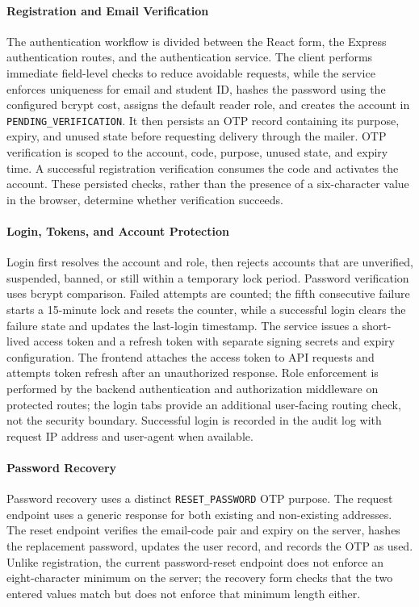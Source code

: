 \paragraph{Registration and Email Verification}
The authentication workflow is divided between the React form, the Express authentication routes, and the authentication service. The client performs immediate field-level checks to reduce avoidable requests, while the service enforces uniqueness for email and student ID, hashes the password using the configured bcrypt cost, assigns the default reader role, and creates the account in \texttt{PENDING\_VERIFICATION}. It then persists an OTP record containing its purpose, expiry, and unused state before requesting delivery through the mailer. OTP verification is scoped to the account, code, purpose, unused state, and expiry time. A successful registration verification consumes the code and activates the account. These persisted checks, rather than the presence of a six-character value in the browser, determine whether verification succeeds.

\paragraph{Login, Tokens, and Account Protection}
Login first resolves the account and role, then rejects accounts that are unverified, suspended, banned, or still within a temporary lock period. Password verification uses bcrypt comparison. Failed attempts are counted; the fifth consecutive failure starts a 15-minute lock and resets the counter, while a successful login clears the failure state and updates the last-login timestamp. The service issues a short-lived access token and a refresh token with separate signing secrets and expiry configuration. The frontend attaches the access token to API requests and attempts token refresh after an unauthorized response. Role enforcement is performed by the backend authentication and authorization middleware on protected routes; the login tabs provide an additional user-facing routing check, not the security boundary. Successful login is recorded in the audit log with request IP address and user-agent when available.

\paragraph{Password Recovery}
Password recovery uses a distinct \texttt{RESET\_PASSWORD} OTP purpose. The request endpoint uses a generic response for both existing and non-existing addresses. The reset endpoint verifies the email-code pair and expiry on the server, hashes the replacement password, updates the user record, and records the OTP as used. Unlike registration, the current password-reset endpoint does not enforce an eight-character minimum on the server; the recovery form checks that the two entered values match but does not enforce that minimum length either.

